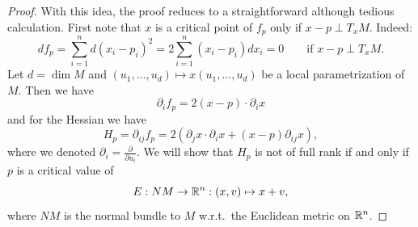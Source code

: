 \begin{proof}
    With this idea, the proof reduces to a straightforward although tedious calculation.
    First note that $x$ is a critical point of $f_p$ only if $x-p \perp T_x M$.
    Indeed:
    \[
        d f_p = \sum_{i=1}^{n} d(x_i - p_i)^2 = 2 \sum_{i=1}^{n} (x_i-p_i) dx_i = 0 \qquad \text{if $x-p \perp T_x M$}
    .\] 
    Let $d = \dim M$ and $(u_1, \ldots, u_d) \mapsto x(u_1, \ldots, u_d)$ be a local parametrization of $M$.
    Then we have
    \[
        \partial_i f_p = 2(x-p) \cdot  \partial_i  x
    \] 
    and for the Hessian we have
    \[
    H_p = \partial_{ij} f_p = 2 \left(\partial_j x \cdot \partial_i x  + (x-p) \partial_{ij} x \right)
    ,\] 
    where we denoted $\partial_i = \frac{\partial }{\partial u_i}$.
    We will show that $H_p$ is not of full rank if and only if $p$ is a critical value of  
    \[
        E: NM \to  \mathbb{R}^n: (x, v) \mapsto x + v
    ,\] 
    where $NM$ is the normal bundle to $M$ w.r.t.\ the Euclidean metric on $\mathbb{R}^n$.


\end{proof}
